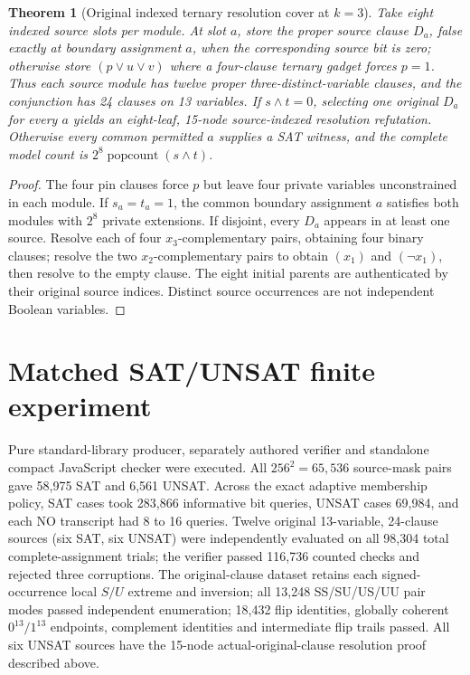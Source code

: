 \documentclass[11pt]{article}
\newtheorem{theorem}{Theorem}
\begin{document}
\begin{theorem}[Original indexed ternary resolution cover at $k=3$]
Take eight indexed source slots per module. At slot $a$, store the proper source clause $D_a$, false exactly at boundary assignment $a$, when the corresponding source bit is zero; otherwise store $(p\lor u\lor v)$ where a four-clause ternary gadget forces $p=1$. Thus each source module has twelve proper three-distinct-variable clauses, and the conjunction has 24 clauses on 13 variables. If $s\wedge t=0$, selecting one original $D_a$ for every $a$ yields an eight-leaf, 15-node source-indexed resolution refutation. Otherwise every common permitted $a$ supplies a SAT witness, and the complete model count is $2^8\operatorname{popcount}(s\wedge t)$.
\end{theorem}
\begin{proof}
The four pin clauses force $p$ but leave four private variables unconstrained in each module. If $s_a=t_a=1$, the common boundary assignment $a$ satisfies both modules with $2^8$ private extensions. If disjoint, every $D_a$ appears in at least one source. Resolve each of four $x_3$-complementary pairs, obtaining four binary clauses; resolve the two $x_2$-complementary pairs to obtain $(x_1)$ and $(\neg x_1)$, then resolve to the empty clause. The eight initial parents are authenticated by their original source indices. Distinct source occurrences are not independent Boolean variables.
\end{proof}

\section{Matched SAT/UNSAT finite experiment}
Pure standard-library producer, separately authored verifier and standalone compact JavaScript checker were executed. All $256^2=65{,}536$ source-mask pairs gave 58,975 SAT and 6,561 UNSAT. Across the exact adaptive membership policy, SAT cases took 283,866 informative bit queries, UNSAT cases 69,984, and each NO transcript had 8 to 16 queries. Twelve original 13-variable, 24-clause sources (six SAT, six UNSAT) were independently evaluated on all 98,304 total complete-assignment trials; the verifier passed 116,736 counted checks and rejected three corruptions. The original-clause dataset retains each signed-occurrence local $S/U$ extreme and inversion; all 13,248 SS/SU/US/UU pair modes passed independent enumeration; 18,432 flip identities, globally coherent $0^{13}/1^{13}$ endpoints, complement identities and intermediate flip trails passed. All six UNSAT sources have the 15-node actual-original-clause resolution proof described above.
\end{document}
